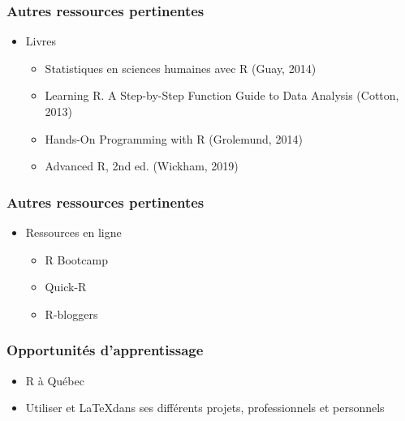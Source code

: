 \documentclass{beamer}
\begin{document}

    \begin{frame}
    
      \frametitle{Autres ressources pertinentes} \vspace{1cm}
      
       \begin{itemize}
        \item Livres
        
          \begin{itemize}
            \item Statistiques en sciences humaines avec R (Guay, 2014)
            \item Learning R. A Step-by-Step Function Guide to Data Analysis (Cotton, 2013)
            \item Hands-On Programming with R (Grolemund, 2014)
            \item Advanced R, 2nd ed. (Wickham, 2019)

        \end{itemize}
      \end{itemize}
      
     \end{frame}


    \begin{frame}
    
      \frametitle{Autres ressources pertinentes} \vspace{1cm}
      
       \begin{itemize}
       \item Ressources en ligne
       
        \begin{itemize}
          \item R Bootcamp
          \item Quick-R
          \item R-bloggers
            
        \end{itemize}
      \end{itemize}
      
     \end{frame}
     


   \begin{frame}
    
      \frametitle{Opportunités d'apprentissage} \vspace{1cm}

        \begin{itemize}
          \item R à Québec
          \item Utiliser \R et \LaTeX dans ses différents projets, professionnels et personnels
            
        \end{itemize}

     \end{frame}
\end{document}
